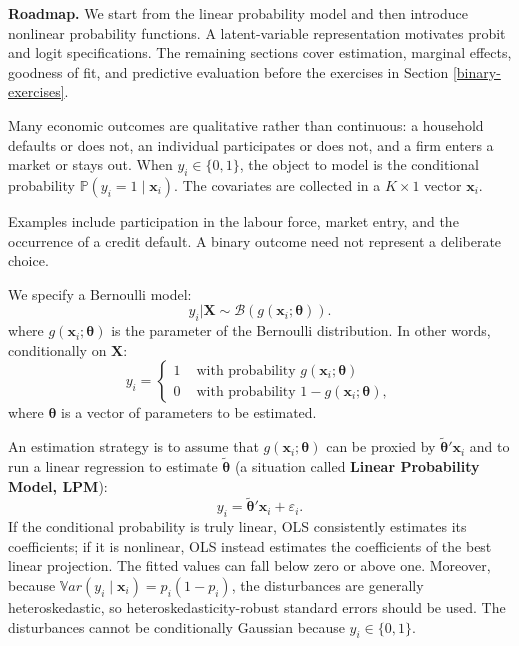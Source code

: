 \documentclass[
  11pt,
]{book}
\theoremstyle{definition}
\theoremstyle{definition}
\theoremstyle{definition}
\theoremstyle{definition}
\theoremstyle{remark}
\begin{document}
\textbf{Roadmap.} We start from the linear probability model and then introduce nonlinear probability functions. A latent-variable representation motivates probit and logit specifications. The remaining sections cover estimation, marginal effects, goodness of fit, and predictive evaluation before the exercises in Section \ref{binary-exercises}.

Many economic outcomes are qualitative rather than continuous: a household defaults or does not, an individual participates or does not, and a firm enters a market or stays out. When \(y_i\in\{0,1\}\), the object to model is the conditional probability \(\mathbb{P}(y_i=1\mid\mathbf{x}_i)\). The covariates are collected in a \(K\times1\) vector \(\mathbf{x}_i\).

Examples include participation in the labour force, market entry, and the occurrence of a credit default. A binary outcome need not represent a deliberate choice.

We specify a Bernoulli model:
\begin{equation}
y_i | \mathbf{X} \sim \mathcal{B}(g(\mathbf{x}_i;\boldsymbol\theta)).
\end{equation}
where \(g(\mathbf{x}_i;\boldsymbol\theta)\) is the parameter of the Bernoulli distribution. In other words, conditionally on \(\mathbf{X}\):
\begin{equation}
y_i = \left\{
\begin{array}{cl}
1 & \mbox{ with probability } g(\mathbf{x}_i;\boldsymbol\theta)\\
0 & \mbox{ with probability } 1-g(\mathbf{x}_i;\boldsymbol\theta),
\end{array}
\right.\label{eq:genericBinary}
\end{equation}
where \(\boldsymbol\theta\) is a vector of parameters to be estimated.

An estimation strategy is to assume that \(g(\mathbf{x}_i;\boldsymbol\theta)\) can be proxied by \(\tilde{\boldsymbol\theta}'\mathbf{x}_i\) and to run a linear regression to estimate \(\tilde{\boldsymbol\theta}\) (a situation called \textbf{Linear Probability Model, LPM}):
\[
y_i = \tilde{\boldsymbol\theta}'\mathbf{x}_i + \varepsilon_i.
\]
If the conditional probability is truly linear, OLS consistently estimates its coefficients; if it is nonlinear, OLS instead estimates the coefficients of the best linear projection. The fitted values can fall below zero or above one. Moreover, because \(\mathbb{V}ar(y_i\mid\mathbf{x}_i)=p_i(1-p_i)\), the disturbances are generally heteroskedastic, so heteroskedasticity-robust standard errors should be used. The disturbances cannot be conditionally Gaussian because \(y_i\in\{0,1\}\).
\end{document}
